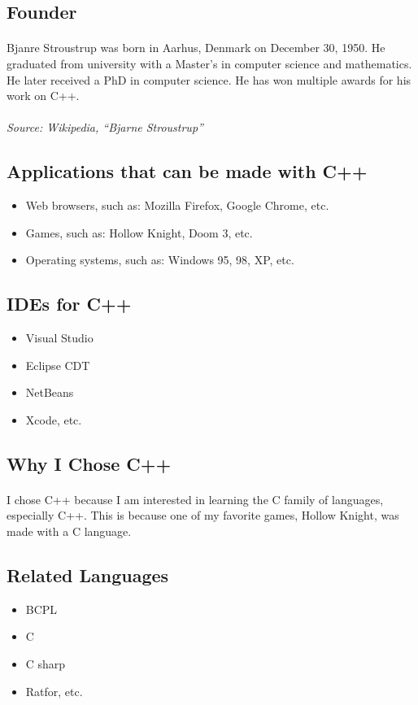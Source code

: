 \documentclass{article}
\begin{document}
\subsection{Founder}
\paragraph{}Bjanre Stroustrup was born in Aarhus, Denmark on December 30, 1950.
He graduated from university with a Master’s in computer science and mathematics. He later received a PhD in computer science.
He has won multiple awards for his work on C++.
\paragraph{}\textit{Source: Wikipedia, “Bjarne Stroustrup”}
\subsection{Applications that can be made with C++}
\begin{itemize}
	\item Web browsers, such as: Mozilla Firefox, Google Chrome, etc.
	\item Games, such as: Hollow Knight, Doom 3, etc.
	\item Operating systems, such as: Windows 95, 98, XP, etc.
\end{itemize}
\subsection{IDEs for C++}
\begin{itemize}
	\item Visual Studio
	\item Eclipse CDT
	\item NetBeans
	\item Xcode, etc.
\end{itemize}
\subsection{Why I Chose C++}
\paragraph{}I chose C++ because I am interested in learning the C family of languages, especially C++.
This is because one of my favorite games, Hollow Knight, was made with a C language.
\subsection{Related Languages}
\begin{itemize}
	\item BCPL
	\item C
	\item C sharp
	\item Ratfor, etc.
\end{itemize}
\end{document}
